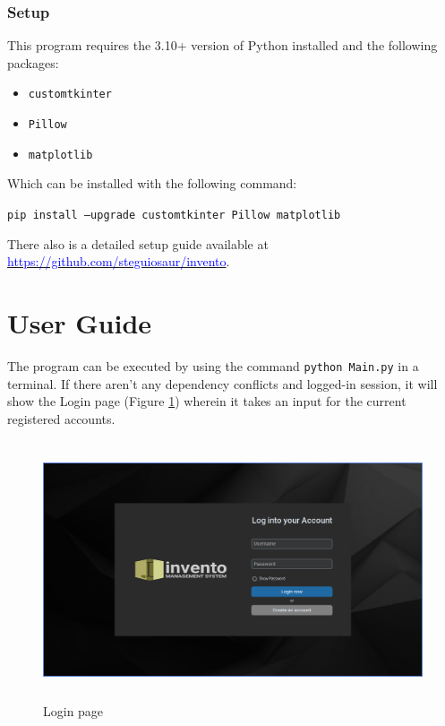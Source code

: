\documentclass[12pt,a4paper]{article}
\renewcommand{\indent}{\hspace\parindent}
\begin{document}
    \section*{Setup}

        This program requires the 3.10+ version of Python installed and the 
        following packages:

        \begin{itemize}
            \item \texttt{customtkinter}
            \item \texttt{Pillow}
            \item \texttt{matplotlib}
        \end{itemize}

        \noindent Which can be installed with the following command:

        \hfill{}

        \texttt{pip install --upgrade customtkinter Pillow matplotlib}

        \hfill{}

        \noindent There also is a detailed setup guide available at 
        \href{https://github.com/steguiosaur/invento}{\textcolor{blue}
        {https://github.com/steguiosaur/invento}}.


    \newpage
    \part{User Guide}

        \indent The program can be executed by using the command \texttt{python Main.py} in a terminal. If there aren't any dependency 
        conflicts and logged-in session, it will show the Login page 
        (Figure \ref{fig:login}) wherein it takes an input for the current 
        registered accounts.

        \begin{figure}[ht]
          \centering
          \includegraphics[width=5in,height=3in]{Login.png}
          \caption{Login page}
          \label{fig:login}
        \end{figure}
\end{document}
